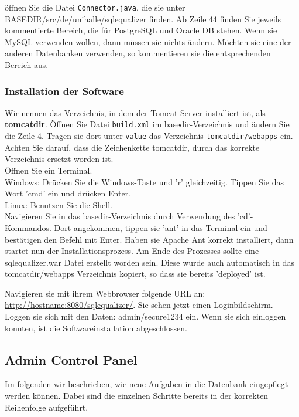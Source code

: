 öffnen Sie die Datei \verb|Connector.java|, die sie unter \url{BASEDIR/src/de/unihalle/sqlequalizer} finden. Ab Zeile 44 finden Sie jeweils kommentierte Bereich, die für PostgreSQL und Oracle DB stehen. Wenn sie MySQL verwenden wollen, dann müssen sie nichts ändern. Möchten sie eine der anderen Datenbanken verwenden, so kommentieren sie die entsprechenden Bereich aus.\\

\subsubsection{Installation der Software}

Wir nennen das Verzeichnis, in dem der Tomcat-Server installiert ist, als \textbf{tomcatdir}.
Öffnen Sie Datei \verb|build.xml| im basedir-Verzeichnis und ändern Sie die Zeile 4. Tragen sie dort unter \verb|value| das Verzeichnis \verb|tomcatdir/webapps| ein. Achten Sie darauf, dass die Zeichenkette tomcatdir, durch das korrekte Verzeichnis ersetzt worden ist.\\

Öffnen Sie ein Terminal.\\
Windows: Drücken Sie die Windows-Taste und 'r' gleichzeitig. Tippen Sie das Wort 'cmd' ein und drücken Enter.\\
Linux: Benutzen Sie die Shell.\\

Navigieren Sie in das basedir-Verzeichnis durch Verwendung des 'cd'-Kommandos. Dort angekommen, tippen sie 'ant' in das Terminal ein und bestätigen den Befehl mit Enter. Haben sie Apache Ant korrekt installiert, dann startet nun der Installationsprozess. Am Ende des Prozesses sollte eine sqlequalizer.war Datei erstellt worden sein. Diese wurde auch automatisch in das tomcatdir/webapps Verzeichnis kopiert, so dass sie bereits 'deployed' ist. 

Navigieren sie mit ihrem Webbrowser folgende URL an: \url{http://hostname:8080/sqlequalizer/}. Sie sehen jetzt einen Loginbildschirm. Loggen sie sich mit den Daten: admin/secure1234 ein. Wenn sie sich einloggen konnten, ist die Softwareinstallation abgeschlossen.

\subsection{Admin Control Panel}

Im folgenden wir beschrieben, wie neue Aufgaben in die Datenbank eingepflegt werden können. Dabei sind die einzelnen Schritte bereits in der korrekten Reihenfolge aufgeführt.


